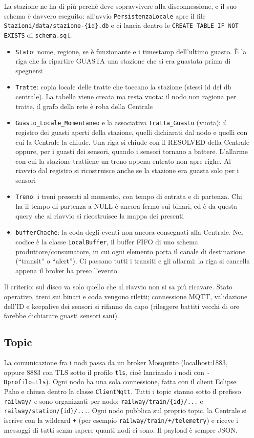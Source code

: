 \documentclass[11pt]{article}
\begin{document}
La stazione ne ha di più perchè deve sopravvivere alla disconnessione, e il suo schema è
davvero eseguito: all'avvio \texttt{PersistenzaLocale} apre il file \texttt{Stazioni/data/stazione-\{id\}.db}
e ci lancia dentro le \texttt{CREATE TABLE IF NOT EXISTS} di \texttt{schema.sql}.
\begin{itemize}
\item \texttt{Stato}: nome, regione, se è funzionante e i timestamp dell'ultimo guasto. È la riga che
fa ripartire GUASTA una stazione che si era guastata prima di spegnersi
\item \texttt{Tratte}: copia locale delle tratte che toccano la stazione (stessi id del db centrale).
La tabella viene creata ma resta vuota: il nodo non ragiona per tratte, il grafo della rete
è roba della Centrale
\item \texttt{Guasto\_Locale\_Momentaneo} e la associativa \texttt{Tratta\_Guasto} (vuota): il registro dei guasti
aperti della stazione, quelli dichiarati dal nodo e quelli con cui la Centrale la chiude. Una
riga si chiude con il RESOLVED della Centrale oppure, per i guasti dei sensori, quando i sensori
tornano a battere. L'allarme con cui la stazione trattiene un treno appena entrato non apre
righe. Al riavvio dal registro si ricostruisce anche se la stazione era guasta solo per i sensori
\item \texttt{Treno}: i treni presenti al momento, con tempo di entrata e di partenza. Chi ha il tempo
di partenza a NULL è ancora fermo sui binari, ed è da questa query che al riavvio si
ricostruisce la mappa dei presenti
\item \texttt{bufferChache}: la coda degli eventi non ancora consegnati alla Centrale. Nel codice è la
classe \texttt{LocalBuffer}, il buffer FIFO di uno schema produttore/consumatore, in cui ogni elemento
porta il canale di destinazione (``transit'' o ``alert''). Ci passano tutti i transiti e gli
allarmi: la riga si cancella appena il broker ha preso l'evento
\end{itemize}

Il criterio: sul disco va solo quello che al riavvio non si sa più ricavare. Stato operativo,
treni sui binari e coda vengono riletti; connessione MQTT, validazione dell'ID e keepalive dei
sensori si rifanno da capo (rileggere battiti vecchi di ore farebbe dichiarare guasti sensori
sani).
\subsection{Topic}
\label{sec:org0894f9a}
La comunicazione fra i nodi passa da un broker Mosquitto (localhost:1883, oppure 8883 con
TLS sotto il profilo \texttt{tls}, cioè lanciando i nodi con \texttt{-Dprofilo=tls}). Ogni nodo ha una sola
connessione, fatta con il client Eclipse Paho e chiusa dentro la classe \texttt{ClientMqtt}. Tutti i topic stanno sotto il prefisso \texttt{railway/} e sono
organizzati per nodo: \texttt{railway/train/\{id\}/...} e \texttt{railway/station/\{id\}/...}. Ogni nodo pubblica
sul proprio topic, la Centrale si iscrive con la wildcard \texttt{+} (per esempio
\texttt{railway/train/+/telemetry}) e riceve i messaggi di tutti senza sapere quanti nodi ci sono. Il
payload è sempre JSON.
\end{document}
